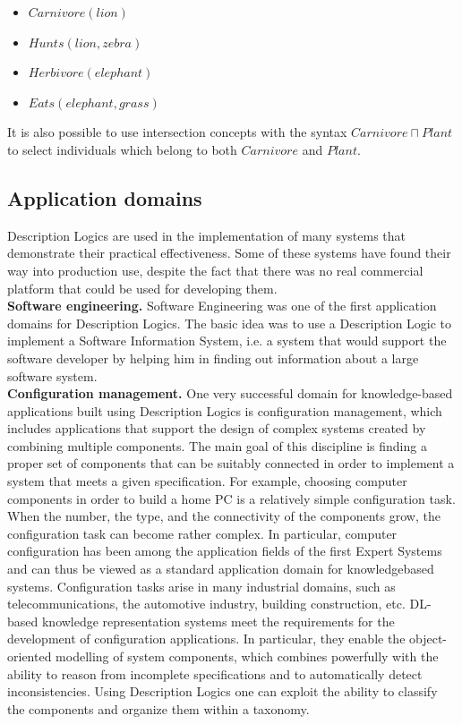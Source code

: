 \documentclass[a4paper, 11pt, oneside]{elsarticle}
\begin{document}
\begin{itemize}
	\item $Carnivore(lion)$
	\item $Hunts(lion, zebra)$
	\item $Herbivore(elephant)$
	\item $Eats(elephant, grass)$
\end{itemize}

It is also possible to use intersection concepts with the syntax $Carnivore \sqcap Plant$ to select individuals which belong to both $Carnivore$ and $Plant$.

\newpage

\subsection{Application domains}
Description Logics are used in the implementation of many systems that demonstrate their practical effectiveness. Some of these systems have found their way into production use, despite the fact that there was no real commercial platform that could be used for developing them.\\

\textbf{Software engineering.} Software Engineering was one of the first application domains for Description Logics. The basic idea was to use a Description Logic to implement a Software Information System, i.e. a system that would support the software developer by helping him in finding out information about a large software system.\\

\textbf{Configuration management.} One very successful domain for knowledge-based applications built using Description Logics is configuration management, which includes applications that support the design of complex systems created by combining multiple components.
The main goal of this discipline is finding a proper set of components that can be suitably connected in order to implement a system that meets a given specification.
For example, choosing computer components in order to build a home PC is a relatively simple configuration task. When the number, the type, and the connectivity of the components grow, the configuration task can become rather complex.
In particular, computer configuration has been among the application fields of the first Expert Systems and can thus be viewed as a standard application domain for knowledgebased systems.
Configuration tasks arise in many industrial domains, such as telecommunications, the automotive industry, building construction, etc.
DL-based knowledge representation systems meet the requirements for the development of configuration applications. In particular, they enable the object-oriented modelling of system components, which combines powerfully with the ability to reason from incomplete specifications and to automatically detect inconsistencies. Using Description Logics one can exploit the ability to classify the components and organize them within a taxonomy.\\
\end{document}
